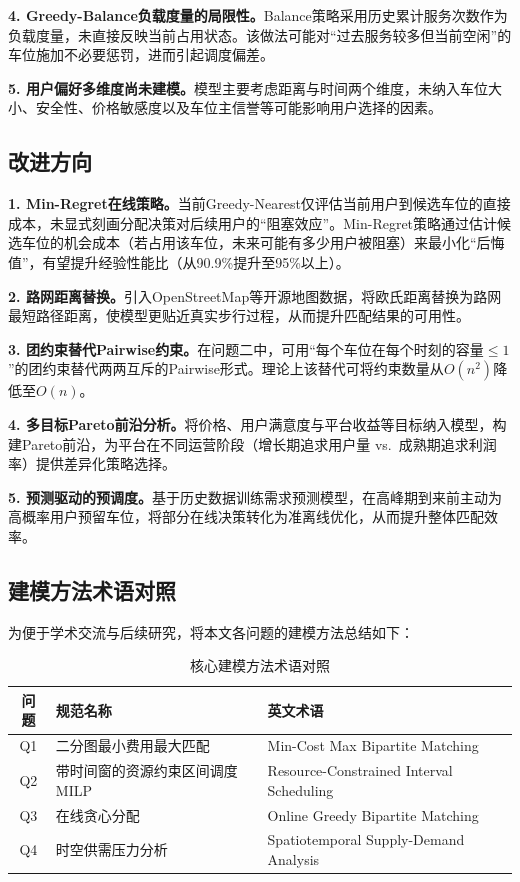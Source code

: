 \documentclass[12pt,a4paper]{ctexart}
\begin{document}
\textbf{4. Greedy-Balance负载度量的局限性。}Balance策略采用历史累计服务次数作为负载度量，未直接反映当前占用状态。该做法可能对``过去服务较多但当前空闲''的车位施加不必要惩罚，进而引起调度偏差。

\textbf{5. 用户偏好多维度尚未建模。}模型主要考虑距离与时间两个维度，未纳入车位大小、安全性、价格敏感度以及车位主信誉等可能影响用户选择的因素。

\subsection{改进方向}

\textbf{1. Min-Regret在线策略。}当前Greedy-Nearest仅评估当前用户到候选车位的直接成本，未显式刻画分配决策对后续用户的``阻塞效应''。Min-Regret策略通过估计候选车位的机会成本（若占用该车位，未来可能有多少用户被阻塞）来最小化``后悔值''，有望提升经验性能比（从90.9\%提升至95\%以上）。

\textbf{2. 路网距离替换。}引入OpenStreetMap等开源地图数据，将欧氏距离替换为路网最短路径距离，使模型更贴近真实步行过程，从而提升匹配结果的可用性。

\textbf{3. 团约束替代Pairwise约束。}在问题二中，可用``每个车位在每个时刻的容量$\leq 1$''的团约束替代两两互斥的Pairwise形式。理论上该替代可将约束数量从$O(n^2)$降低至$O(n)$。

\textbf{4. 多目标Pareto前沿分析。}将价格、用户满意度与平台收益等目标纳入模型，构建Pareto前沿，为平台在不同运营阶段（增长期追求用户量 vs.\ 成熟期追求利润率）提供差异化策略选择。

\textbf{5. 预测驱动的预调度。}基于历史数据训练需求预测模型，在高峰期到来前主动为高概率用户预留车位，将部分在线决策转化为准离线优化，从而提升整体匹配效率。

\subsection{建模方法术语对照}

为便于学术交流与后续研究，将本文各问题的建模方法总结如下：

\begin{table}[H]
  \centering
  \caption{核心建模方法术语对照}
  \label{tab:methods}
  \begin{tabular}{c|l|l}
    \toprule
    问题 & 规范名称 & 英文术语 \\
    \midrule
    Q1 & 二分图最小费用最大匹配 & Min-Cost Max Bipartite Matching \\
    Q2 & 带时间窗的资源约束区间调度MILP & Resource-Constrained Interval Scheduling \\
    Q3 & 在线贪心分配 & Online Greedy Bipartite Matching \\
    Q4 & 时空供需压力分析 & Spatiotemporal Supply-Demand Analysis \\
    \bottomrule
  \end{tabular}
\end{table}
\end{document}
